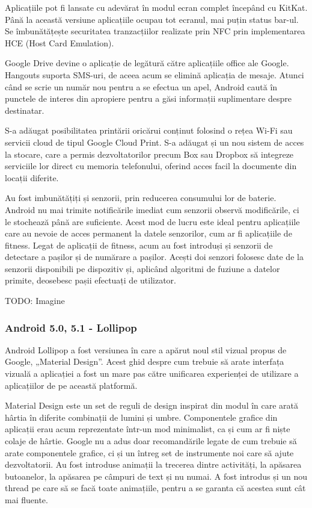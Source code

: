 \documentclass[12pt,a4paper]{article}
\begin{document}
	Aplicațiile pot fi lansate cu adevărat în modul ecran complet începând cu KitKat. Până la această versiune aplicațiile ocupau tot ecranul, mai puțin status bar-ul. Se îmbunătățește securitatea tranzacțiilor realizate prin NFC prin implementarea  HCE (Host Card Emulation).

	Google Drive devine o aplicație de legătură către aplicațiile office ale Google. Hangouts suporta SMS-uri, de aceea acum se elimină aplicația de mesaje. Atunci când se scrie un număr nou pentru a se efectua un apel, Android caută în punctele de interes din apropiere pentru a găsi informații suplimentare despre destinatar.

	S-a adăugat posibilitatea printării oricărui conținut folosind o rețea Wi-Fi sau servicii cloud de tipul Google Cloud Print. S-a adăugat și un nou sistem de acces la stocare, care a permis dezvoltatorilor precum Box sau Dropbox să integreze serviciile lor direct cu memoria telefonului, oferind acces facil la documente din locații diferite.

	Au fost imbunătățiți și senzorii, prin reducerea consumului lor de baterie. Android nu  mai trimite notificările imediat cum senzorii observă modificările, ci le stochează până are suficiente.  Acest mod de lucru este ideal pentru aplicațiile care au nevoie de acces permanent la datele senzorilor, cum ar fi aplicațiile de fitness. Legat de aplicații de fitness, acum au fost introduși și senzorii de detectare a pașilor și de numărare a pașilor. Acești doi senzori folosesc date de la senzorii disponibili pe dispozitiv și, aplicând algoritmi de fuziune a datelor primite, deosebesc pașii efectuați de utilizator.

	TODO: Imagine

\subsubsection{Android 5.0, 5.1 - Lollipop}
Android Lollipop a fost versiunea în care a apărut noul stil vizual propus de Google, „Material Design”. Acest ghid despre cum trebuie să arate interfața vizuală a aplicației a fost un mare pas către unificarea experienței de utilizare a aplicațiilor de pe această platformă.
	
	Material Design este un set de reguli de design inspirat din modul în care arată hârtia în diferite combinații de lumini și umbre.
Componentele grafice din aplicații erau acum reprezentate într-un mod minimalist, ca și cum ar fi niște colaje de hârtie. Google nu a adus doar recomandările legate de cum trebuie să arate componentele grafice, ci și un întreg set de instrumente noi care să ajute dezvoltatorii. Au fost introduse animații la trecerea dintre activități, la apăsarea butoanelor, la apăsarea pe câmpuri de text și nu numai. A fost introdus și un nou thread pe care să se facă toate animațiile, pentru a se garanta că acestea sunt cât mai fluente.
	
\end{document}
